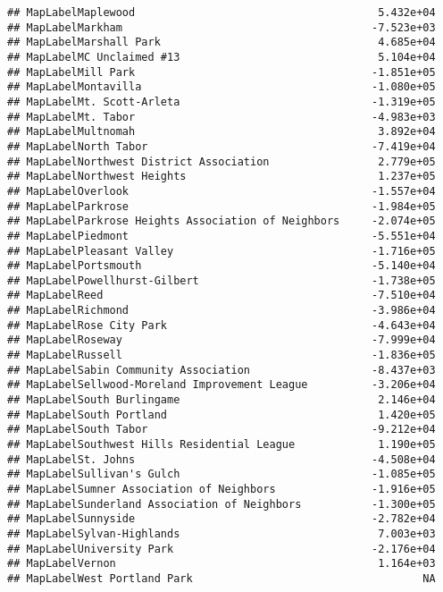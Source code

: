 \documentclass[]{article}
\begin{document}
\begin{verbatim}
## MapLabelMaplewood                                      5.432e+04
## MapLabelMarkham                                       -7.523e+03
## MapLabelMarshall Park                                  4.685e+04
## MapLabelMC Unclaimed #13                               5.104e+04
## MapLabelMill Park                                     -1.851e+05
## MapLabelMontavilla                                    -1.080e+05
## MapLabelMt. Scott-Arleta                              -1.319e+05
## MapLabelMt. Tabor                                     -4.983e+03
## MapLabelMultnomah                                      3.892e+04
## MapLabelNorth Tabor                                   -7.419e+04
## MapLabelNorthwest District Association                 2.779e+05
## MapLabelNorthwest Heights                              1.237e+05
## MapLabelOverlook                                      -1.557e+04
## MapLabelParkrose                                      -1.984e+05
## MapLabelParkrose Heights Association of Neighbors     -2.074e+05
## MapLabelPiedmont                                      -5.551e+04
## MapLabelPleasant Valley                               -1.716e+05
## MapLabelPortsmouth                                    -5.140e+04
## MapLabelPowellhurst-Gilbert                           -1.738e+05
## MapLabelReed                                          -7.510e+04
## MapLabelRichmond                                      -3.986e+04
## MapLabelRose City Park                                -4.643e+04
## MapLabelRoseway                                       -7.999e+04
## MapLabelRussell                                       -1.836e+05
## MapLabelSabin Community Association                   -8.437e+03
## MapLabelSellwood-Moreland Improvement League          -3.206e+04
## MapLabelSouth Burlingame                               2.146e+04
## MapLabelSouth Portland                                 1.420e+05
## MapLabelSouth Tabor                                   -9.212e+04
## MapLabelSouthwest Hills Residential League             1.190e+05
## MapLabelSt. Johns                                     -4.508e+04
## MapLabelSullivan's Gulch                              -1.085e+05
## MapLabelSumner Association of Neighbors               -1.916e+05
## MapLabelSunderland Association of Neighbors           -1.300e+05
## MapLabelSunnyside                                     -2.782e+04
## MapLabelSylvan-Highlands                               7.003e+03
## MapLabelUniversity Park                               -2.176e+04
## MapLabelVernon                                         1.164e+03
## MapLabelWest Portland Park                                    NA

\end{verbatim}
\end{document}
